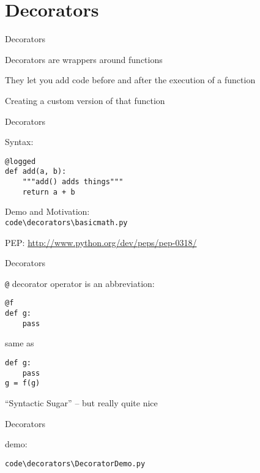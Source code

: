 \documentclass{beamer}
\begin{document}
\section{Decorators}

\begin{frame}[fragile]{Decorators}

{\LARGE Decorators are wrappers around functions}

\vfill
{\LARGE They let you add code before and after the execution of a function}

\vfill
{\LARGE Creating a custom version of that function}

\end{frame} 

\begin{frame}[fragile]{Decorators}

{\LARGE Syntax:}

\vfill
\begin{verbatim}
@logged
def add(a, b):
    """add() adds things"""
    return a + b
\end{verbatim}

\vfill
{\Large Demo and Motivation: \\
 \verb|code\decorators\basicmath.py| }

\vfill
PEP: \url{http://www.python.org/dev/peps/pep-0318/}

\end{frame} 

\begin{frame}[fragile]{Decorators}

{\LARGE \verb|@| decorator operator is an abbreviation:}

\vfill
\begin{verbatim}
@f
def g:
    pass
\end{verbatim}

\vfill
same as

\vfill
\begin{verbatim}
def g:
    pass
g = f(g)
\end{verbatim}

\vfill
{\Large ``Syntactic Sugar'' -- but really quite nice}

\end{frame} 

\begin{frame}[fragile]{Decorators}

{\LARGE demo:

\vfill
\begin{verbatim}
code\decorators\DecoratorDemo.py
\end{verbatim}

}
\end{frame} 
\end{document}
